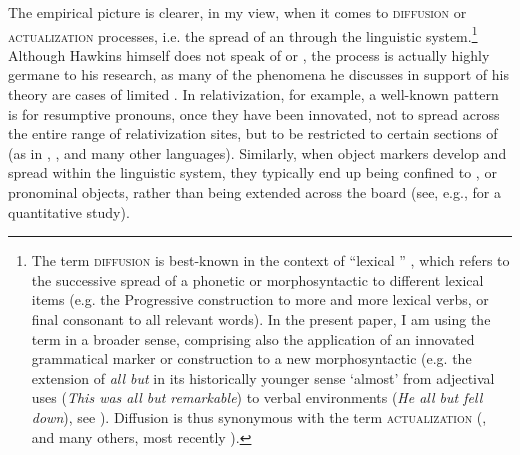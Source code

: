 \documentclass[output=paper]{langsci/langscibook}
\begin{document}
The empirical picture is clearer, in my view, when it comes to \textsc{diffusion} or \textsc{actualization} processes, i.e. the spread of an  through the linguistic system.\footnote{The term \textsc{diffusion} is best-known in the context of “lexical ” \citep{Wang1969_Diff}, which refers to the successive spread of a phonetic or morphosyntactic  to different lexical items (e.g. the Progressive construction to more and more lexical verbs, or final consonant  to all relevant words). In the present paper, I am using the term  in a broader sense, comprising also the application of an innovated grammatical marker or construction to a new morphosyntactic  (e.g. the extension of \textit{all but} in its historically younger sense ‘almost’ from adjectival uses (\textit{This was all but remarkable}) to verbal environments (\textit{He all but fell down}), see  \citealt{DeSmet2012_Act}). Diffusion is thus synonymous with the term \textsc{actualization} (\citealt{Timberlake1977_Act}, \citealt{Andersen2001_Actual} and many others, most recently  \citealt{DeSmet2012_Act}).} Although Hawkins himself does not speak of  or , the process is actually highly germane to his research, as many of the phenomena he discusses in support of his  theory are cases of limited . In relativization, for example, a well-known pattern is for resumptive pronouns, once they have been innovated, not to spread across the entire range of relativization sites, but to be restricted to certain sections of   (as in , ,  and many other languages). Similarly, when object  markers develop and spread within the linguistic system, they typically end up being confined to ,  or pronominal objects, rather than being extended across the board (see, e.g., \citealt{Sinnemäki2014} for a quantitative study). 
\end{document}
